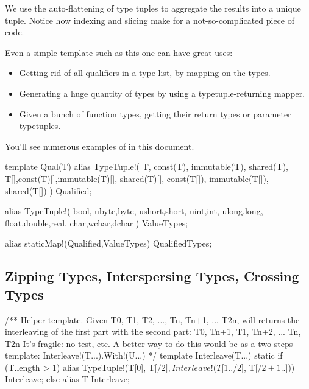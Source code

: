 
We use the auto-flattening of type tuples to aggregate the results into a unique tuple. Notice how indexing and slicing make for a not-so-complicated piece of code.

Even a simple template such as this one can have great uses:

\begin{itemize}
\item Getting rid of all qualifiers in a type list, by mapping  on the types.
\item Generating a huge quantity of types by using a typetuple-returning mapper.
\item Given a bunch of function types, getting their return types or parameter typetuples.
\end{itemize}

You'll see numerous examples of  in this document.

\begin{dcode}
template Qual(T)
{
    alias TypeTuple!(
                     T, const(T), immutable(T), shared(T),
                     T[],const(T)[],immutable(T)[], shared(T)[], 
                     const(T[]), immutable(T[]), shared(T[])
                    ) Qualified;
}

alias TypeTuple!(
                 bool,
                 ubyte,byte,
                 ushort,short,
                 uint,int,
                 ulong,long,
                 float,double,real,
                 char,wchar,dchar
                ) ValueTypes;

alias staticMap!(Qualified,ValueTypes) QualifiedTypes;
\end{dcode}

\subsection{Zipping Types, Interspersing Types, Crossing Types}

\begin{dcode}
/**
Helper template. Given T0, T1, T2, ..., Tn, Tn+1, ... T2n, will returns
the interleaving of the first part with the second part: T0, Tn+1, T1, Tn+2, ... Tn, T2n
It's fragile: no test, etc. A better way to do this would be as a two-steps template: Interleave!(T...).With!(U...)
*/
template Interleave(T...)
{
    static if (T.length > 1)
        alias TypeTuple!(T[0], T[$/2], Interleave!(T[1..$/2], T[$/2+1 .. $])) Interleave;
    else
        alias T Interleave;
}
\end{dcode}

